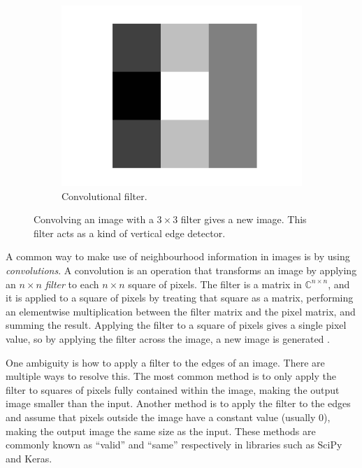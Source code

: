 \begin{figure}[!ht]
\begin{subfigure}[t]{0.5\textwidth}
            \end{subfigure}
            \begin{subfigure}[t]{0.3\textwidth}
                \centering
                \includegraphics[width=\textwidth]
                    {images/convolutional_filter.png}
                \caption{Convolutional filter.}
                \label{fig:convolution-face-filter}
            \end{subfigure}
            \caption{Convolving an image with a $3 \times 3$ filter gives a new
                image. This filter acts as a kind of vertical edge detector.}
            \label{fig:convolved-face}
        \end{figure}

        A common way to make use of neighbourhood information in images is by
        using \emph{convolutions}. A convolution is an operation that transforms
        an image by applying an $n \times n$ \emph{filter} to each $n \times n$
        square of pixels. The filter is a matrix in $\mathbb{C}^{n \times n}$,
        and it is applied to a square of pixels by treating that square as a
        matrix, performing an elementwise multiplication between the filter
        matrix and the pixel matrix, and summing the result. Applying the filter
        to a square of pixels gives a single pixel value, so by applying the
        filter across the image, a new image is generated \citep{ludwig15}.

        One ambiguity is how to apply a filter to the edges of an image. There
        are multiple ways to resolve this. The most common method is to only
        apply the filter to squares of pixels fully contained within the image,
        making the output image smaller than the input. Another method is to
        apply the filter to the edges and assume that pixels outside the image
        have a constant value (usually 0), making the output image the same size
        as the input. These methods are commonly known as ``valid'' and ``same''
        respectively in libraries such as SciPy and Keras.

